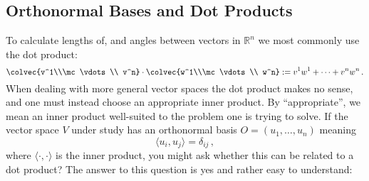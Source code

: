 
\subsection{Orthonormal Bases and Dot Products}

To calculate lengths of, and angles between vectors in ${\mathbb R}^n$ we most commonly use the dot product:
\[
\colvec{v^1\\\mc \vdots \\ v^n}\cdot \colvec{w^1\\\mc \vdots \\ w^n}:=v^1 w^1 + \cdots + v^n w^n\, .
\] 
When dealing with more general vector spaces
the dot product makes no sense, and one must instead choose an appropriate inner product. By ``appropriate'', we mean an inner product well-suited to the problem one is trying to solve. If the vector space $V$ under study has an orthonormal basis $O=(u_1,\ldots, u_n)$ meaning 
\[
\langle u_i,u_j\rangle=\delta_{ij}\, ,
\]
where $\langle\cdot,\cdot\rangle$ is the inner product, you might ask whether this can be related to a dot product? The answer to this question is yes and rather easy to understand:

